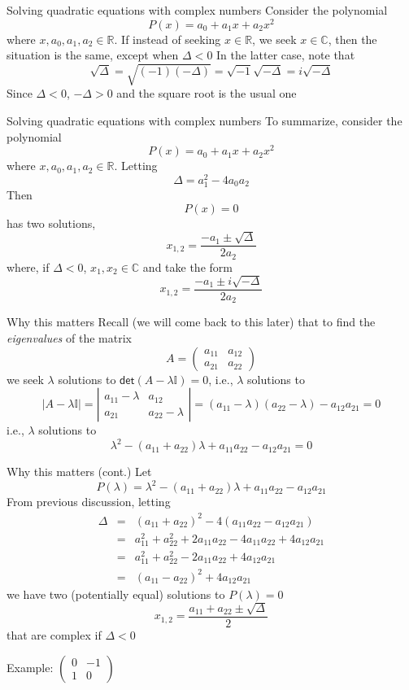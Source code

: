 \documentclass{beamer}
\def\IC{\mathbb{C}}
\def\II{\mathbb{I}}
\def\IR{\mathbb{R}}
\renewcommand{\det}{\ensuremath{\mathsf{det}}}
\begin{document}
\begin{frame}{Solving quadratic equations with complex numbers}
	Consider the polynomial
	\[
	P(x)=a_0+a_1x+a_2x^2
	\]
	where $x,a_0,a_1,a_2\in\IR$. If instead of seeking $x\in\IR$, we seek $x\in\IC$, then the situation is the same, except when $\Delta<0$
	\vfill
	In the latter case, note that
	\[
	\sqrt{\Delta} 
	= \sqrt{(-1)(-\Delta)} 
	= \sqrt{-1}\sqrt{-\Delta}
	= i\sqrt{-\Delta}
	\]
	\vfill
	Since $\Delta<0$, $-\Delta>0$ and the square root is the usual one
\end{frame}

\begin{frame}{Solving quadratic equations with complex numbers}
	To summarize, consider the polynomial
	\[
	P(x)=a_0+a_1x+a_2x^2
	\]
	where $x,a_0,a_1,a_2\in\IR$. Letting
	\[
	\Delta = a_1^2-4a_0a_2
	\]
	\vfill
	Then 
	\[
	P(x)=0
	\]
	has two solutions, 
	\[
	x_{1,2} = \frac{-a_1\pm\sqrt{\Delta}}{2a_2}
	\]
	where, if $\Delta<0$, $x_1,x_2\in\IC$ and take the form
	\[
	x_{1,2} = \frac{-a_1\pm i\sqrt{-\Delta}}{2a_2}
	\]
\end{frame}

\begin{frame}{Why this matters}
Recall (we will come back to this later) that to find the \emph{eigenvalues} of the matrix
\[
A=
\begin{pmatrix}
a_{11} & a_{12} \\ a_{21} & a_{22}
\end{pmatrix}
\]
we seek $\lambda$ solutions to $\det(A-\lambda\II)=0$, i.e., $\lambda$ solutions to
\[
|A-\lambda\II|
=\left|
\begin{matrix}
a_{11}-\lambda & a_{12} \\ a_{21} & a_{22}-\lambda
\end{matrix}
\right|
=(a_{11}-\lambda)(a_{22}-\lambda)-a_{12}a_{21}=0
\]
i.e., $\lambda$ solutions to
\[
\lambda^2 - (a_{11}+a_{22})\lambda + a_{11}a_{22}-a_{12}a_{21} = 0
\]
\end{frame}

\begin{frame}{Why this matters (cont.)}
Let
\[
P(\lambda) = \lambda^2 - (a_{11}+a_{22})\lambda + a_{11}a_{22}-a_{12}a_{21}
\]
From previous discussion, letting 
\[
\begin{matrix} 
\Delta &=& (a_{11}+a_{22})^2-4(a_{11}a_{22}-a_{12}a_{21}) \\
&=& a_{11}^2+a_{22}^2+2a_{11}a_{22}
-4a_{11}a_{22}+4a_{12}a_{21} \\
&=& a_{11}^2+a_{22}^2-2a_{11}a_{22}
+4a_{12}a_{21} \\
&=& (a_{11}-a_{22})^2+4a_{12}a_{21}
\end{matrix}
\]
we have two (potentially equal) solutions to $P(\lambda)=0$
\[
x_{1,2} = \frac{a_{11}+a_{22}\pm \sqrt{\Delta}}{2}
\]
that are complex if $\Delta<0$

Example:
$\begin{pmatrix}
0 & -1 \\ 1 & 0
\end{pmatrix}$

\end{frame}
\end{document}
